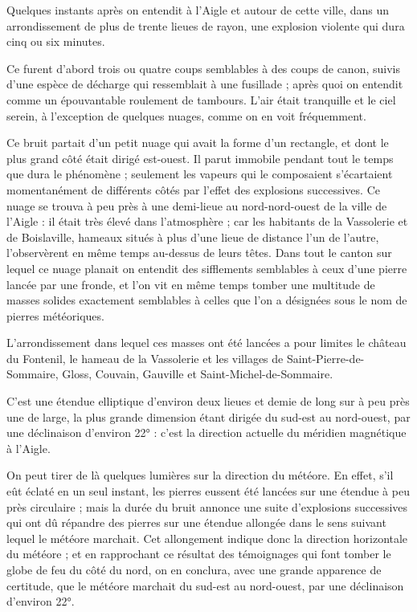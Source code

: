 \documentclass[a4paper, 11pt, oneside, polutonikogreek, french]{article}
\begin{document}
Quelques instants après on entendit à l'Aigle et autour de cette ville, dans un arrondissement de plus de trente lieues de rayon, une explosion violente qui dura cinq ou six minutes.

Ce furent d'abord trois ou quatre coups semblables à des coups de canon, suivis d'une espèce de décharge qui ressemblait à une fusillade ; après quoi on entendit comme un épouvantable roulement de tambours. L'air était tranquille et le ciel serein, à l'exception de quelques nuages, comme on en voit fréquemment.

Ce bruit partait d'un petit nuage qui avait la forme d'un rectangle, et dont le plus grand côté était dirigé est-ouest. Il parut immobile pendant tout le temps que dura le phénomène ; seulement les vapeurs qui le composaient s'écartaient momentanément de différents côtés par l'effet des explosions successives. Ce nuage se trouva à peu près à une demi-lieue au nord-nord-ouest de la ville de l'Aigle : il était très élevé dans l'atmosphère ; car les habitants de la Vassolerie et de Boislaville, hameaux situés à plus d'une lieue de distance l'un de l'autre, l'observèrent en même temps au-dessus de leurs têtes. Dans tout le canton sur lequel ce nuage planait on entendit des sifflements semblables à ceux d'une pierre lancée par une fronde, et l'on vit en même temps tomber une multitude de masses solides exactement semblables à celles que l'on a désignées sous le nom de pierres météoriques.

L'arrondissement dans lequel ces masses ont été lancées a pour limites le château du Fontenil, le hameau de la Vassolerie et les villages de Saint-Pierre-de-Sommaire, Gloss, Couvain, Gauville et Saint-Michel-de-Sommaire.

C'est une étendue elliptique d'environ deux lieues et demie de long sur à peu près une de large, la plus grande dimension étant dirigée du sud-est au nord-ouest, par une déclinaison d'environ 22° : c'est la direction actuelle du méridien magnétique à l'Aigle.

On peut tirer de là quelques lumières sur la direction du météore. En effet, s'il eût éclaté en un seul instant, les pierres eussent été lancées sur une étendue à peu près circulaire ; mais la durée du bruit annonce une suite d'explosions successives qui ont dû répandre des pierres sur une étendue allongée dans le sens suivant lequel le météore marchait. Cet allongement indique donc la direction horizontale du météore ; et en rapprochant ce résultat des témoignages qui font tomber le globe de feu du côté du nord, on en conclura, avec une grande apparence de certitude, que le météore marchait du sud-est au nord-ouest, par une déclinaison d'environ 22°.
\end{document}
